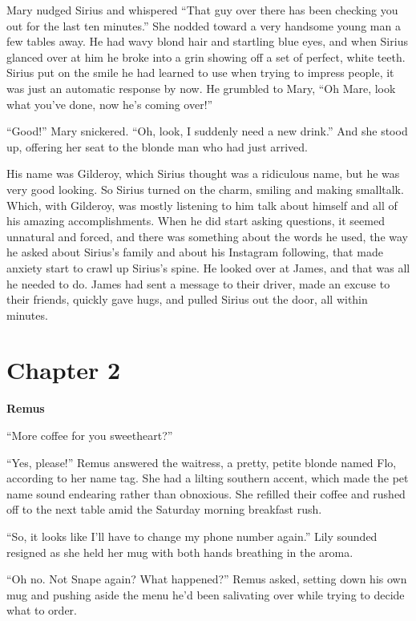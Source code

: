\documentclass[12pt,twoside,openright]{memoir}
\begin{document}
Mary nudged Sirius and whispered ``That guy over there has been checking you out for the last ten minutes.'' She nodded toward a very handsome young man a few tables away. He had wavy blond hair and startling blue eyes, and when Sirius glanced over at him he broke into a grin showing off a set of perfect, white teeth. Sirius put on the smile he had learned to use when trying to impress people, it was just an automatic response by now. He grumbled to Mary, ``Oh Mare, look what you've done, now he's coming over!''

``Good!'' Mary snickered. ``Oh, look, I suddenly need a new drink.'' And she stood up, offering her seat to the blonde man who had just arrived.

His name was Gilderoy, which Sirius thought was a ridiculous name, but he was very good looking. So Sirius turned on the charm, smiling and making smalltalk. Which, with Gilderoy, was mostly listening to him talk about himself and all of his amazing accomplishments. When he did start asking questions, it seemed unnatural and forced, and there was something about the words he used, the way he asked about Sirius's family and about his Instagram following, that made anxiety start to crawl up Sirius's spine. He looked over at James, and that was all he needed to do. James had sent a message to their driver, made an excuse to their friends, quickly gave hugs, and pulled Sirius out the door, all within minutes.

\chapter*{Chapter 2}

\textbf{Remus} 

``More coffee for you sweetheart?'' 

``Yes, please!'' Remus answered the waitress, a pretty, petite blonde named Flo, according to her name tag. She had a lilting southern accent, which made the pet name sound endearing rather than obnoxious. She refilled their coffee and rushed off to the next table amid the Saturday morning breakfast rush.

``So, it looks like I'll have to change my phone number again.'' Lily sounded resigned as she held her mug with both hands breathing in the aroma.

``Oh no. Not Snape again? What happened?'' Remus asked, setting down his own mug and pushing aside the menu he'd been salivating over while trying to decide what to order.
\end{document}
